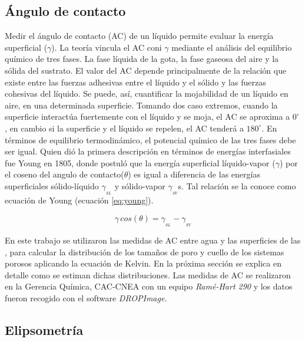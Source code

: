 	\subsection{Ángulo de contacto}

		Medir el ángulo de contacto (AC) de un líquido permite evaluar la energía superficial ($\gamma$). La teoría vincula el AC coni $\gamma$ mediante el análisis del equilibrio químico de tres fases. La fase líquida de la gota, la fase gaseosa del aire y la sólida del sustrato. El valor del AC depende principalmente de la relación que existe entre las fuerzas adhesivas entre el líquido y el sólido y las fuerzas cohesivas del líquido. Se puede, así, cuantificar la mojabilidad de un líquido en aire, en una determinada superficie.\cite{findenegg1997} Tomando dos caso extremos, cuando la superficie interactúa fuertemente con el líquido y se moja, el AC se aproxima a $0^{\circ}$, en cambio si la superficie y el líquido se repelen, el AC tenderá a $180^{\circ}$. En términos de equilibrio termodinámico, el potencial químico de las tres fases  debe ser igual. Quien dió la primera descripción en términos de energías interfasiales fue Young en 1805\cite{young1805}, donde postuló que la energía superficial líquido-vapor ($\gamma$) por el coseno del angulo de contacto($\theta$) es igual a diferencia de las energías superficiales sólido-líquido $\gamma_{_{SL}}$ y sólido-vapor $\gamma_{_{SV}}$s. Tal relación se la conoce como ecuación de Young (ecuación \ref{eq:young}).

			\begin{equation}
				\gamma\, cos(\theta) = \gamma_{_{SL}} - \gamma_{_{SV}}
				\label{eq:young} 
				\end{equation}

		En este trabajo se utilizaron las medidas de AC entre agua y las superficies de las \pdm, para calcular la distribución de los tamaños de poro y cuello de los sistemas porosos aplicando la ecuación de Kelvin.\cite{Boissiere2005} En la próxima sección se explica en detalle como se estiman dichas distribuciones.
		Las medidas de AC se realizaron en la Gerencia Química, CAC-CNEA con un equipo \textit{Ramé-Hart 290} y los datos fueron recogido con el software \textit{DROPImage}.

	\subsection{Elipsometría}\label{sec:elipso}

